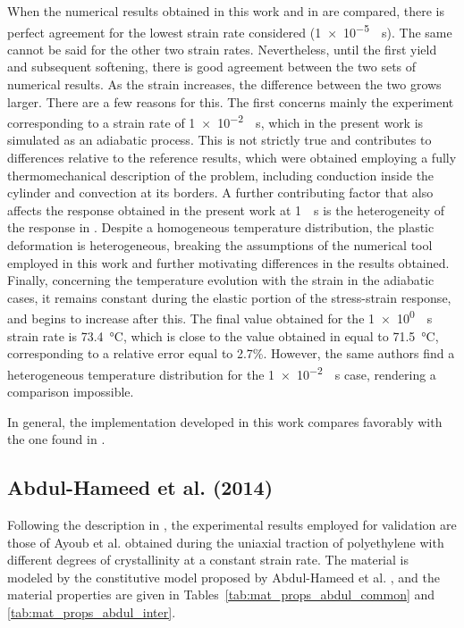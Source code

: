 When the numerical results obtained in this work and in \cite{haoUnifiedAmorphousCrystalline2022} are compared, there is perfect agreement for the lowest strain rate considered (\SI{1e-5}{\per\second}).
The same cannot be said for the other two strain rates.
Nevertheless, until the first yield and subsequent softening, there is good agreement between the two sets of numerical results.
As the strain increases, the difference between the two grows larger.
There are a few reasons for this.
The first concerns mainly the experiment corresponding to a strain rate of \SI{1e-2}{\per\second}, which in the present work is simulated as an adiabatic process.
This is not strictly true and contributes to differences relative to the reference results, which were obtained employing a fully thermomechanical description of the problem, including conduction inside the cylinder and convection at its borders.
A further contributing factor that also affects the response obtained in the present work at \SI{1}{\per\second} is the heterogeneity of the response in \cite{haoUnifiedAmorphousCrystalline2022}.
Despite a homogeneous temperature distribution, the plastic deformation is heterogeneous, breaking the assumptions of the numerical tool employed in this work and further motivating differences in the results obtained.
Finally, concerning the temperature evolution with the strain in the adiabatic cases, it remains constant during the elastic portion of the stress-strain response, and begins to increase after this.
The final value obtained for the \SI{1e0}{\per\second} strain rate is \SI{73.4}{\celsius}, which is close to the value obtained in \cite{haoUnifiedAmorphousCrystalline2022} equal to \SI{71.5}{\celsius}, corresponding to a relative error equal to 2.7\%.
However, the same authors find a heterogeneous temperature distribution for the \SI{1e-2}{\per\second} case, rendering a comparison impossible.

In general, the implementation developed in this work compares favorably with the one found in \cite{haoUnifiedAmorphousCrystalline2022}.

\subsection{Abdul-Hameed et al. (2014)}

Following the description in \cite{abdul-hameedTwophaseHyperelasticviscoplasticConstitutive2014}, the experimental results employed for validation are those of Ayoub et al. \citep{ayoubEffectsCrystalContent2011} obtained during the uniaxial traction of polyethylene with different degrees of crystallinity at a constant strain rate.
The material is modeled by the constitutive model proposed by Abdul-Hameed et al. \citep{abdul-hameedTwophaseHyperelasticviscoplasticConstitutive2014}, and the material properties are given in Tables~\ref{tab:mat_props_abdul_common} and \ref{tab:mat_props_abdul_inter}.
%

